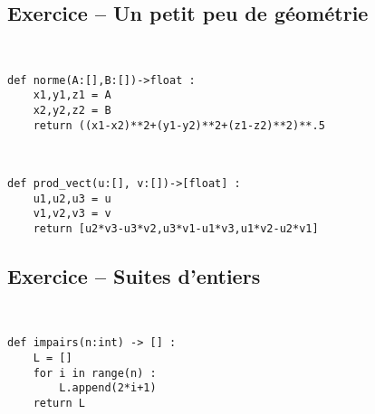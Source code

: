 \subsection*{Exercice -- Un petit peu de géométrie}

\ifprof
\begin{corrige}~\\ \vspace{-.5cm} \vspace{-.5cm}
\begin{lstlisting}
def norme(A:[],B:[])->float :
    x1,y1,z1 = A
    x2,y2,z2 = B
    return ((x1-x2)**2+(y1-y2)**2+(z1-z2)**2)**.5
\end{lstlisting}
\end{corrige}
\else
\fi

\ifprof
\begin{corrige}~\\ \vspace{-.5cm}
\begin{lstlisting}
def prod_vect(u:[], v:[])->[float] :
    u1,u2,u3 = u
    v1,v2,v3 = v
    return [u2*v3-u3*v2,u3*v1-u1*v3,u1*v2-u2*v1]
\end{lstlisting}
\end{corrige}
\else
\fi



\subsection*{Exercice -- Suites d'entiers}

\ifprof
\begin{corrige}~\\ \vspace{-.5cm}
\begin{lstlisting}
def impairs(n:int) -> [] :
    L = []
    for i in range(n) : 
        L.append(2*i+1)
    return L
\end{lstlisting}
\end{corrige}
\else
\fi

